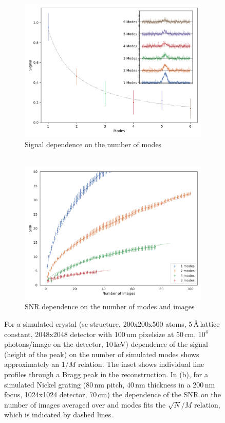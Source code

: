 \begin{figure}
	\centering
	\begin{subfigure}[b]{0.45\textwidth}
		\includegraphics[width=\linewidth]{images/modes_signal.pdf}
		\caption{Signal dependence on the number of modes\\ ${}$}
		\label{fig:modes}
	\end{subfigure}
	\hspace{0.02\textwidth}
	\begin{subfigure}[b]{0.45\textwidth}
	\includegraphics[width=\linewidth]{images/SNRNimagesgrating.pdf}
	\caption{SNR dependence on the number of modes and images}
	\label{fig:SNRNimages}
\end{subfigure}
\caption[SNR dependence on the number of modes and images]{For a simulated crystal
	(sc-structure, 200x200x500 atoms, 5\,\AA\,lattice constant, 2048x2048 detector with 100\,um pixelsize at 50\,cm, $10^4$ photons/image on the detector, 10\,keV) dependence of the signal (height of the peak) on the number of simulated modes shows approximately an $1/M$ relation.  The inset shows individual line profiles through a Bragg peak in the reconstruction. In (b), for a simulated Nickel grating (80\,nm pitch, 40\,nm thickness in a 200\,nm focus, 1024x1024 detector, 70\,cm) the dependence of the SNR on the number of images averaged over and modes fits the $\sqrt{N}/M$ relation, which is indicated by dashed lines.}
\end{figure}
